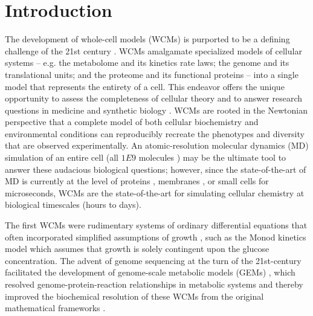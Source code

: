 \label{WCMpy_chapter}

\section{Introduction}
The development of whole-cell models (WCMs) \cite{Bhat2020Whole-CellSurvey} is purported to be a defining challenge of the 21st century \cite{Tomita2001Whole-cellCentury}. WCMs amalgamate specialized models of cellular systems -- e.g. the metabolome and its kinetics rate laws; the genome and its translational units; and the proteome and its functional proteins -- into a single model that represents the entirety of a cell. This endeavor offers the unique opportunity to assess the completeness of cellular theory \cite{Palsson2000TheBiology,Feig2019Whole-cellDetail} and to answer research questions in medicine \cite{Bordbar2015PersonalizedPharmacodynamics,Loscalzo2011SystemsMedicine} and synthetic biology \cite{Purcell2013TowardsBiology}. WCMs are rooted in the Newtonian perspective that a complete model of both cellular biochemistry and environmental conditions can reproducibly recreate the phenotypes and diversity that are observed experimentally. An atomic-resolution molecular dynamics (MD) simulation of an entire cell (all $1E9$ molecules \cite[][approximated from cellular mass]{Lewis2014MassPopulations}) may be the ultimate tool to answer these audacious biological questions; however, since the state-of-the-art of MD is currently at the level of proteins \cite{Adcock2006MolecularProteins}, membranes \cite{Egberts1994MolecularMembrane,Alper1993ComputerDynamics,Alper1993TheStudy}, or small cells \cite{Perilla2015MolecularComplexes} for microseconds, WCMs are the state-of-the-art for simulating cellular chemistry \cite{Feig2015CompleteBiology} at biological timescales (hours to days). 

The first WCMs \cite{Karr2015TheModeling} were rudimentary systems of ordinary differential equations that often incorporated simplified assumptions of growth \cite{PERRET1960APopulation}, such as the Monod kinetics model \cite{Han1988ExtendedInhibition} which assumes that growth is solely contingent upon the glucose concentration. The advent of genome sequencing at the turn of the 21st-century \cite{Collins2003TheBiology, Covert2001MetabolicSilico} facilitated the development of genome-scale metabolic models (GEMs) \cite{Varma1994StoichiometricW3110,Edwards2000TheCapabilities}, which resolved genome-protein-reaction relationships \cite{Edwards2001InData} in metabolic systems and thereby improved the biochemical resolution of these WCMs from the original mathematical frameworks \cite{Gibson1988PredictingTemperature,Ho2021UnconventionalTargets}. 

